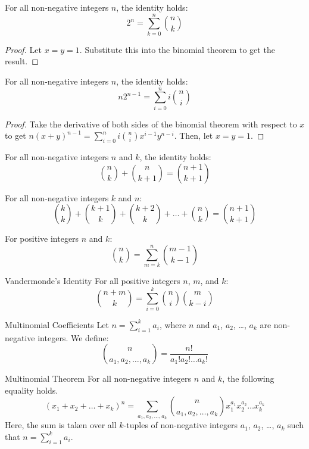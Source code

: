 \documentclass[letterpaper]{article}
\begin{document}
\begin{theorem}{}{}
    For all non-negative integers $n$, the identity holds:
    \[2^n = \sum_{k = 0}^n \binom{n}{k}\]
\end{theorem}
\begin{proof}
    Let $x = y = 1$. Substitute this into the binomial theorem to get the result. 
\end{proof}

\begin{theorem}{}{}
    For all non-negative integers $n$, the identity holds:
    \[n2^{n - 1} = \sum_{i = 0}^{n} i \binom{n}{i}\]
\end{theorem}
\begin{proof}
    Take the derivative of both sides of the binomial theorem with respect to $x$ to get $n(x + y)^{n - 1} = \sum_{i = 0}^{n} i\binom{n}{i}x^{i - 1}y^{n - i}$. Then, let $x = y = 1$. 
\end{proof}

\begin{theorem}{}{}
    For all non-negative integers $n$ and $k$, the identity holds:
    \[\binom{n}{k} + \binom{n}{k + 1} = \binom{n + 1}{k + 1}\]
\end{theorem}

\begin{theorem}{}{}
    For all non-negative integers $k$ and $n$:
    \[\binom{k}{k} + \binom{k + 1}{k} + \binom{k + 2}{k} + \dots + \binom{n}{k} = \binom{n + 1}{k + 1}\]
\end{theorem}

\begin{theorem}{}{}
    For positive integers $n$ and $k$:
    \[\binom{n}{k} = \sum_{m = k}^n \binom{m - 1}{k - 1}\]
\end{theorem}

\begin{theorem}{Vandermonde's Identity}{}
    For all positive integers $n$, $m$, and $k$:
    \[\binom{n + m}{k} = \sum_{i = 0}^k \binom{n}{i} \binom{m}{k - i}\]
\end{theorem}

\begin{definition}{Multinomial Coefficients}{}
    Let $n = \sum_{i = 1}^k a_i$, where $n$ and $a_1$, $a_2$, \dots, $a_k$ are non-negative integers. We define:
    \[\binom{n}{a_1,a_2,\dots,a_k} = \frac{n!}{a_{1}! a_{2}! \dots a_{k}!}\]
\end{definition}

\begin{theorem}{Multinomial Theorem}{}
    For all non-negative integers $n$ and $k$, the following equality holds.
    \[(x_1 + x_2 + \dots + x_k)^n = \sum_{a_1,a_2,\dots,a_k} \binom{n}{a_1,a_2,\dots,a_k} x_{1}^{a_1} x_{2}^{a_2} \dots x_{k}^{a_k}\]
    Here, the sum is taken over all $k$-tuples of non-negative integers $a_1$, $a_2$, \dots, $a_k$ such that $n = \sum_{i = 1}^k a_i$. 
\end{theorem}
\end{document}

